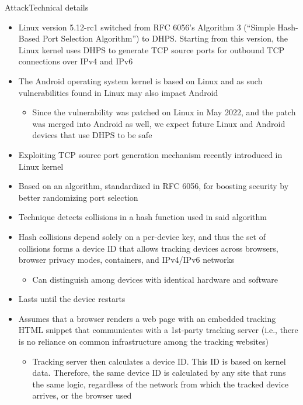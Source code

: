 \documentclass[a4paper]{article}
\begin{document}
\begin{frame}[fragile]{Attack}{Technical details}
	\begin{itemize}
    \item Linux version 5.12-rc1 switched from RFC 6056’s Algorithm 3 (\enquote{Simple Hash-Based Port Selection Algorithm}) to DHPS. Starting from this version, the Linux kernel uses DHPS to generate TCP source ports for outbound TCP connections over IPv4 and IPv6
    \item The Android operating system kernel is based on Linux and as such vulnerabilities found in Linux may also impact Android
    \begin{itemize}
      \item Since the vulnerability was patched on Linux in May 2022, and the patch was merged into Android as well, we expect future Linux and Android devices that use DHPS to be safe
    \end{itemize}
		\item Exploiting TCP source port generation mechanism recently introduced in Linux kernel
		\item Based on an algorithm, standardized in RFC 6056, for boosting security by better randomizing port selection
		\item Technique detects collisions in a hash function used in said algorithm
		\item Hash collisions depend solely on a per-device key, and thus the set of collisions forms a device ID that allows tracking devices across browsers, browser privacy modes, containers, and IPv4/IPv6 networks
		\begin{itemize}
			\item Can distinguish among devices with identical hardware and software
		\end{itemize}
		\item Lasts until the device restarts
		\item Assumes that a browser renders a web page with an embedded tracking HTML snippet that communicates with a 1st-party tracking server (i.e., there is no reliance on common infrastructure among the tracking websites)
		\begin{itemize}
			\item Tracking server then calculates a device ID. This ID is based on kernel data. Therefore, the same device ID is calculated by any site that runs the same logic, regardless of the network from which the tracked device arrives, or the browser used

\end{itemize}
\end{itemize}
\end{frame}
\end{document}
